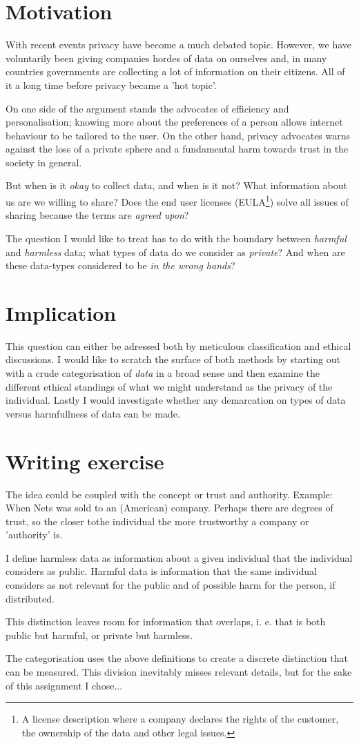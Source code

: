 \documentclass{article}
\begin{document}
\section{Motivation}
With recent events privacy have become a much debated topic. However, we 
have voluntarily been giving companies hordes of data on ourselves and,
in many countries governments are collecting a lot of information on their
citizens. All of it a long time before privacy became a 'hot topic'.

On one side of the argument stands the advocates of efficiency
and personalisation; knowing more about the preferences of a person
allows internet behaviour to be tailored to the user. On the other 
hand, privacy advocates warns against the loss of a
private sphere and a fundamental harm towards trust in the
society in general.

But when is it \textit{okay} to collect data, and when is it not?
What information about us are we willing to share?
Does the end user licenses (EULA\footnote{A license description where a company 
declares the rights of the customer, the ownership of the data and other legal
issues.}) solve all issues of sharing because the terms are 
\textit{agreed upon}?

The question I would like to treat has to do with the boundary between 
\textit{harmful} and \textit{harmless} data; what types of data do we
consider as \textit{private}? And when are these data-types considered 
to be \textit{in the wrong hands}? 

\section{Implication}
This question can either be adressed both by meticulous
classification and ethical discussions. I would like to scratch the 
surface of both methods by starting out with a crude categorisation 
of \textit{data} in a broad sense and then examine the different
ethical standings of what we might understand as the privacy of the
individual. Lastly I would investigate whether any demarcation
on types of data versus harmfullness of data can be made.

\section{Writing exercise}
The idea could be coupled with the concept or trust and authority. 
Example: When Nets was sold to an (American) company. Perhaps there are
degrees of trust, so the closer tothe individual the more trustworthy 
a company or 'authority' is. 

I define harmless data as information about a given individual that the 
individual considers as public.
Harmful data is information that the same individual considers as not 
relevant for the public and of possible harm for the person, if distributed.

This distinction leaves room for information that overlaps, i. e. that is
both public but harmful, or private but harmless.

The categorisation uses the above definitions to create a discrete 
distinction that can be measured. This division inevitably misses 
relevant details, but for the sake of this assignment I chose...
\end{document}
